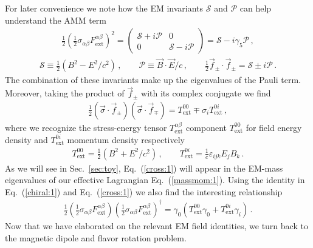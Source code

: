\documentclass{ws-ijmpa}
\newcommand{\req}[1]{Eq.~(\ref{#1})}
\newcommand{\rsec}[1]{Sec.~{\ref{#1}}}
\begin{document}
For later convenience we note how the EM invariants $\mathcal{S}$ and $\mathcal{P}$ can help understand the AMM term 
\begin{align}
\label{invar:1}
\frac{1}{2}\left(\frac{1}{2}\sigma_{\alpha\beta}F^{\alpha\beta}_\mathrm{ext}\right)^{2}=
\begin{pmatrix}
\mathcal{S}+i\mathcal{P} & 0\\
0 & \mathcal{S}-i\mathcal{P}
\end{pmatrix}=\mathcal{S}-i\gamma_{5}\mathcal{P}\,,
\end{align}
%
\begin{align}
\mathcal{S}\equiv\frac{1}{2}\left(B^{2}-E^{2}/c^{2}\right)\,,\qquad
\mathcal{P}\equiv\vec{B}\cdot\vec{E}/c\,,\qquad
\frac{1}{2}\vec{f}_{\pm}\cdot\vec{f}_{\pm}=\mathcal{S}\pm i\mathcal{P}\,.
\end{align}
The combination of these invariants make up the eigenvalues of the Pauli term. Moreover, taking the product of $\vec{f}_{\pm}$ with its complex conjugate we find
\begin{align}
\label{cross:1}
\frac{1}{2}\left(\vec{\sigma}\cdot\vec{f}_{\pm}\right)\left(\vec{\sigma}\cdot\vec{f}_{\mp}\right)=T_\mathrm{ext}^{00}\mp \sigma_{i}T_\mathrm{ext}^{0i}\,,
\end{align}
where we recognize the stress-energy tensor $T_\mathrm{ext}^{\alpha\beta}$ component $T_\mathrm{ext}^{00}$ for field energy density and $T_\mathrm{ext}^{0i}$ momentum density respectively
\begin{align}
T_\mathrm{ext}^{00}=\frac{1}{2}\left(B^{2}+E^{2}/c^{2}\right)\,,\qquad
T_\mathrm{ext}^{0i}=\frac{1}{c}\varepsilon_{ijk}E_{j}B_{k}\,.
\end{align}
As we will see in \rsec{sec:toy}, \req{cross:1} will appear in the EM-mass eigenvalues of our effective Lagrangian \req{massmom:1}. Using the identity in \req{chiral:1} and \req{cross:1} we also find the interesting relationship
\begin{align}
\label{cross:2}
\frac{1}{2}\left(\frac{1}{2}\sigma_{\alpha\beta}F^{\alpha\beta}_\mathrm{ext}\right)\left(\frac{1}{2}\sigma_{\alpha\beta}F^{\alpha\beta}_\mathrm{ext}\right)^{\dag}=
\gamma_{0}\left(T_\mathrm{ext}^{00}\gamma_{0}+T_\mathrm{ext}^{0i}\gamma_{i}\right)\,.
\end{align}
Now that we have elaborated on the relevant EM field identities, we turn back to the magnetic dipole and flavor rotation problem.

\end{document}
